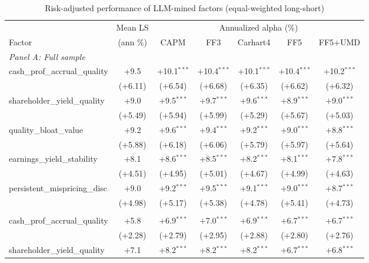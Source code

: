 \begin{table}[htbp]\centering
\caption{Risk-adjusted performance of LLM-mined factors (equal-weighted long-short)}
\label{tab:alphas_ew}
\begin{threeparttable}\footnotesize
\begin{tabular}{lcccccc}
\toprule
 & Mean LS & \multicolumn{5}{c}{Annualized alpha (\%)} \\
\cmidrule(lr){3-7}
Factor & (ann \%) & CAPM & FF3 & Carhart4 & FF5 & FF5+UMD \\
\midrule
\multicolumn{7}{l}{\textit{Panel A: Full sample}} \\
\addlinespace
cash\_prof\_accrual\_quality & +9.5 & +10.1$^{***}$ & +10.4$^{***}$ & +10.1$^{***}$ & +10.4$^{***}$ & +10.2$^{***}$ \\
 & (+6.11) & (+6.54) & (+6.68) & (+6.35) & (+6.62) & (+6.32) \\
\addlinespace
shareholder\_yield\_quality & +9.0 & +9.5$^{***}$ & +9.7$^{***}$ & +9.6$^{***}$ & +8.9$^{***}$ & +9.0$^{***}$ \\
 & (+5.49) & (+5.94) & (+5.99) & (+5.29) & (+5.67) & (+5.03) \\
\addlinespace
quality\_bloat\_value & +9.2 & +9.6$^{***}$ & +9.4$^{***}$ & +9.2$^{***}$ & +9.0$^{***}$ & +8.8$^{***}$ \\
 & (+5.88) & (+6.18) & (+6.06) & (+5.79) & (+5.97) & (+5.64) \\
\addlinespace
earnings\_yield\_stability & +8.1 & +8.6$^{***}$ & +8.5$^{***}$ & +8.2$^{***}$ & +8.1$^{***}$ & +7.8$^{***}$ \\
 & (+4.51) & (+4.95) & (+5.01) & (+4.67) & (+4.99) & (+4.63) \\
\addlinespace
persistent\_mispricing\_disc & +9.0 & +9.2$^{***}$ & +9.5$^{***}$ & +9.1$^{***}$ & +9.0$^{***}$ & +8.7$^{***}$ \\
 & (+4.98) & (+5.17) & (+5.38) & (+4.78) & (+5.41) & (+4.73) \\
\addlinespace
\midrule
\multicolumn{7}{l}{\textit{Panel B: Out-of-sample (post-2000-12-31)}} \\
\addlinespace
cash\_prof\_accrual\_quality & +5.8 & +6.9$^{***}$ & +7.0$^{***}$ & +6.9$^{***}$ & +6.7$^{***}$ & +6.7$^{***}$ \\
 & (+2.28) & (+2.79) & (+2.95) & (+2.88) & (+2.80) & (+2.76) \\
\addlinespace
shareholder\_yield\_quality & +7.1 & +8.2$^{***}$ & +8.2$^{***}$ & +8.2$^{***}$ & +6.7$^{***}$ & +6.8$^{***}$ \\

\end{tabular}
\end{threeparttable}
\end{table}
